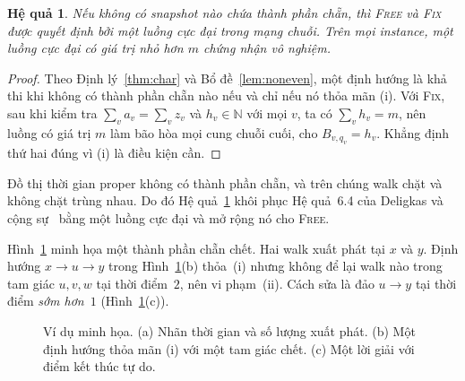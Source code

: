 \documentclass[pdflatex,sn-mathphys-num]{sn-jnl}
\theoremstyle{thmstyleone}%
\newtheorem{corollary}[theorem]{Hệ quả}%
\theoremstyle{thmstyletwo}%
\theoremstyle{thmstylethree}%
\newcommand{\N}{\mathbb{N}}
\newcommand{\FIX}{\textup{\textsc{Fix}}}
\newcommand{\FREE}{\textup{\textsc{Free}}}
\newcommand{\RunningVertices}{%
  \node[vtx] (x) at (0,0) {$x$};
  \node[vtx] (u) at (1.45,0) {$u$};
  \node[vtx] (y) at (2.9,0) {$y$};
  \node[vtx] (v) at (0.8,1.3) {$v$};
  \node[vtx] (w) at (2.1,1.3) {$w$};}
\begin{document}
\begin{corollary}\label{cor:flow}
Nếu không có snapshot nào chứa thành phần chẵn, thì \FREE{} và \FIX{} được quyết định bởi một luồng cực đại trong mạng chuỗi. Trên mọi instance, một luồng cực đại có giá trị nhỏ hơn $m$ chứng nhận vô nghiệm.
\end{corollary}

\begin{proof}
Theo Định lý~\ref{thm:char} và Bổ đề~\ref{lem:noneven}, một định hướng là khả thi khi không có thành phần chẵn nào nếu và chỉ nếu nó thỏa mãn (i). Với \FIX{}, sau khi kiểm tra $\sum_va_v=\sum_vz_v$ và $h_v\in\N$ với mọi $v$, ta có $\sum_vh_v=m$, nên luồng có giá trị $m$ làm bão hòa mọi cung chuỗi cuối, cho $B_{v,q_v}=h_v$. Khẳng định thứ hai đúng vì (i) là điều kiện cần.
\end{proof}


Đồ thị thời gian proper không có thành phần chẵn, và trên chúng walk chặt và không chặt trùng nhau. Do đó Hệ quả~\ref{cor:flow} khôi phục Hệ quả~6.4 của Deligkas và cộng sự~\cite{deligkas2025} bằng một luồng cực đại và mở rộng nó cho \FREE{}.

Hình~\ref{fig:running} minh họa một thành phần chẵn chết. Hai walk xuất phát tại $x$ và $y$. Định hướng $x\to u\to y$ trong Hình~\ref{fig:running}(b) thỏa~(i) nhưng không để lại walk nào trong tam giác $u,v,w$ tại thời điểm~$2$, nên vi phạm~(ii). Cách sửa là đảo $u\to y$ tại thời điểm \emph{sớm hơn}~$1$ (Hình~\ref{fig:running}(c)).


\begin{figure}[htb]
\centering
{}
\caption{Ví dụ minh họa. (a) Nhãn thời gian và số lượng xuất phát. (b) Một định hướng thỏa mãn (i) với một tam giác chết. (c) Một lời giải với điểm kết thúc tự do.}
\label{fig:running}
\end{figure}
\end{document}
